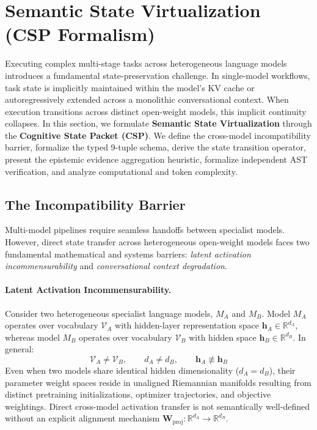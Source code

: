 \section{Semantic State Virtualization (CSP Formalism)}
\label{sec:semantic_state}

Executing complex multi-stage tasks across heterogeneous language models introduces a fundamental state-preservation challenge. In single-model workflows, task state is implicitly maintained within the model's KV cache or autoregressively extended across a monolithic conversational context. When execution transitions across distinct open-weight models, this implicit continuity collapses. In this section, we formulate \textbf{Semantic State Virtualization} through the \textbf{Cognitive State Packet (CSP)}. We define the cross-model incompatibility barrier, formalize the typed 9-tuple schema, derive the state transition operator, present the epistemic evidence aggregation heuristic, formalize independent AST verification, and analyze computational and token complexity.

\subsection{The Incompatibility Barrier}
\label{sec:incompatibility_barrier}

Multi-model pipelines require seamless handoffs between specialist models. However, direct state transfer across heterogeneous open-weight models faces two fundamental mathematical and systems barriers: \textit{latent activation incommensurability} and \textit{conversational context degradation}.

\paragraph{Latent Activation Incommensurability.}
Consider two heterogeneous specialist language models, $M_A$ and $M_B$. Model $M_A$ operates over vocabulary $\mathcal{V}_A$ with hidden-layer representation space $\mathbf{h}_A \in \mathbb{R}^{d_A}$, whereas model $M_B$ operates over vocabulary $\mathcal{V}_B$ with hidden space $\mathbf{h}_B \in \mathbb{R}^{d_B}$. In general:
\begin{equation}
\mathcal{V}_A \neq \mathcal{V}_B, \qquad d_A \neq d_B, \qquad \mathbf{h}_A \not\equiv \mathbf{h}_B
\end{equation}
Even when two models share identical hidden dimensionality ($d_A = d_B$), their parameter weight spaces reside in unaligned Riemannian manifolds resulting from distinct pretraining initializations, optimizer trajectories, and objective weightings. Direct cross-model activation transfer is not semantically well-defined without an explicit alignment mechanism $\mathbf{W}_{\text{proj}}: \mathbb{R}^{d_A} \to \mathbb{R}^{d_B}$. 

